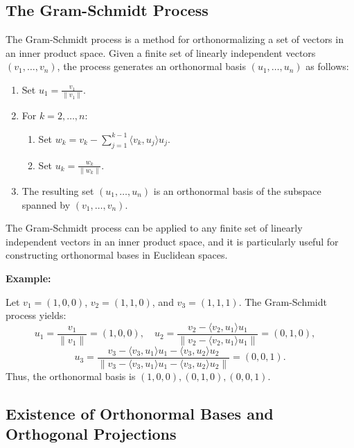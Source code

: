 \subsection{The Gram-Schmidt Process}

The Gram-Schmidt process is a method for orthonormalizing a set of vectors in an inner product space. Given a finite set of linearly independent vectors \( (v_1, \ldots, v_n) \), the process generates an orthonormal basis \( (u_1, \ldots, u_n) \) as follows:
\begin{enumerate}
    \item Set \( u_1 = \frac{v_1}{\|v_1\|} \).
    \item For \( k = 2, \ldots, n \):
    \begin{enumerate}
        \item Set \( w_k = v_k - \sum_{j=1}^{k-1} \langle v_k, u_j \rangle u_j \).
        \item Set \( u_k = \frac{w_k}{\|w_k\|} \).
    \end{enumerate}
    \item The resulting set \( (u_1, \ldots, u_n) \) is an orthonormal basis of the subspace spanned by \( (v_1, \ldots, v_n) \).
\end{enumerate}

The Gram-Schmidt process can be applied to any finite set of linearly independent vectors in an inner product space, and it is particularly useful for constructing orthonormal bases in Euclidean spaces.
\vspace{\baselineskip}

\textbf{Example:}
\vspace{\baselineskip}
 

Let \( v_1 = (1, 0, 0) \), \( v_2 = (1, 1, 0) \), and \( v_3 = (1, 1, 1) \). The Gram-Schmidt process yields:
\[
u_1 = \frac{v_1}{\|v_1\|} = (1, 0, 0), \quad
u_2 = \frac{v_2 - \langle v_2, u_1 \rangle u_1}{\|v_2 - \langle v_2, u_1 \rangle u_1\|} = \left(0, 1, 0\right), \quad
\]
\[
u_3 = \frac{v_3 - \langle v_3, u_1 \rangle u_1 - \langle v_3, u_2 \rangle u_2}{\|v_3 - \langle v_3, u_1 \rangle u_1 - \langle v_3, u_2 \rangle u_2\|} = \left(0, 0, 1\right).
\]
Thus, the orthonormal basis is \( (1, 0, 0), (0, 1, 0), (0, 0, 1) \).

\subsection{Existence of Orthonormal Bases and Orthogonal Projections}

